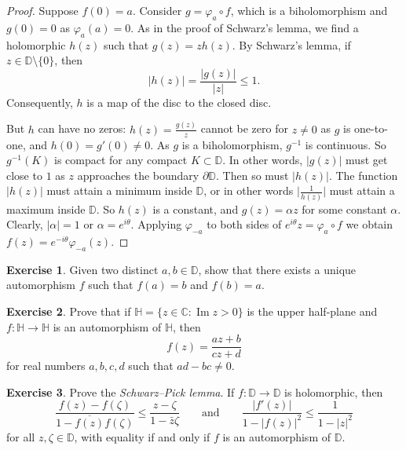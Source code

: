 \documentclass[12pt,openany]{book}
\renewcommand{\Im}{\operatorname{Im}}
\newcommand{\sabs}[1]{\lvert {#1} \rvert}
\newcommand{\babs}[1]{\bigl\lvert {#1} \bigr\rvert}
\newcommand{\abs}[1]{\left\lvert {#1} \right\rvert}
\newcommand{\C}{{\mathbb{C}}}
\newcommand{\D}{{\mathbb{D}}}
\newcommand{\bH}{{\mathbb{H}}}
\newcommand{\myindex}[1]{#1\index{#1}}
\theoremstyle{plain}
\theoremstyle{remark}
\theoremstyle{definition}
\newenvironment{exbox}{%
    \def\FrameCommand{\vrule width 1pt \relax\hspace {10pt}}%
    \MakeFramed {\advance \hsize -\width \FrameRestore }%
}{%
    \endMakeFramed
}
\theoremstyle{exercise}
\newtheorem{exercise}{Exercise}[section]
\theoremstyle{example}
\begin{document}
\begin{proof}
Suppose $f(0) = a$.
Consider $g = \varphi_a \circ f$, which is a biholomorphism
and $g(0) = 0$ as
$\varphi_a(a) = 0$.
As in the proof of Schwarz's lemma, we find a holomorphic $h(z)$
such that $g(z) = z h(z)$.  By
Schwarz's lemma, if $z \in \D \setminus \{ 0 \}$, then
\begin{equation*}
\sabs{h(z)} = \frac{\sabs{g(z)}}{\sabs{z}} \leq 1 .
\end{equation*}
Consequently, $h$ is a map of the disc to the closed disc.

But $h$ can have no zeros:
$h(z) = \frac{g(z)}{z}$ cannot be zero for $z \not= 0$ as $g$ is one-to-one,
and $h(0) = g'(0) \not= 0$.  As $g$ is a biholomorphism, $g^{-1}$ is
continuous. So $g^{-1}(K)$ is compact for any compact $K \subset \D$.
In other words, $\sabs{g(z)}$ must get close to $1$ as $z$
approaches the boundary $\partial \D$.  Then so must $\sabs{h(z)}$.
The function
$\sabs{h(z)}$ must attain a minimum inside $\D$, or in other
words $\babs{\frac{1}{h(z)}}$ must attain a maximum inside $\D$.  So $h(z)$
is a constant, and $g(z) = \alpha z$ for some constant $\alpha$.
Clearly, 
$\sabs{\alpha} = 1$ or $\alpha = e^{i\theta}$.  Applying
$\varphi_{-a}$ to both sides of $e^{i\theta} z = \varphi_a \circ f$
we obtain $f(z) = e^{-i\theta} \varphi_{-a}(z)$.
\end{proof}

\begin{exbox}
\begin{exercise}
Given two distinct $a,b \in \D$, show that there exists a unique automorphism
$f$ such that $f(a) = b$ and $f(b) = a$.
\end{exercise}

\begin{exercise}
Prove that if $\bH = \{ z \in \C : \Im z > 0 \}$ is the upper half-plane
and $f \colon \bH \to \bH$ is an automorphism of $\bH$, then
\begin{equation*}
f(z) = \frac{a z +b}{c z + d}
\end{equation*}
for real numbers $a,b,c,d$ such that $ad-bc \not= 0$.
\end{exercise}

\begin{exercise}
Prove the \emph{\myindex{Schwarz--Pick lemma}}.
If $f \colon \D \to \D$ is holomorphic, then
\begin{equation*}
\frac{f(z)-f(\zeta)}{1-\overline{f(z)}f(\zeta)} \leq
\frac{z-\zeta}{1-\bar{z}\zeta} 
\qquad
\text{and}
\qquad
\frac{\abs{f'(z)}}{1-\abs{f(z)}^2} \leq
\frac{1}{1-\abs{z}^2}
\end{equation*}
for all $z,\zeta \in \D$,
with equality if and only if $f$ is an automorphism of $\D$.
\end{exercise}
\end{exbox}
\end{document}
